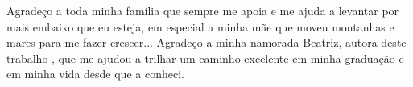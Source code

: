 \begin{agradecimentos}
Agradeço a toda minha família que sempre me apoia e me ajuda a levantar por mais embaixo que eu esteja, em especial a minha mãe que moveu montanhas e mares para me fazer crescer...
Agradeço a minha namorada Beatriz, autora deste trabalho , que me ajudou a trilhar um caminho excelente em minha graduação e em minha vida desde que a conheci.

\end{agradecimentos}
